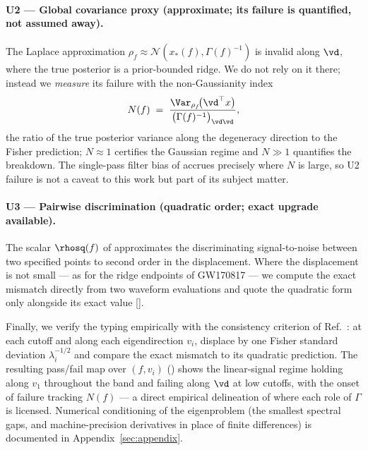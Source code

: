 \paragraph{U2 --- Global covariance proxy (approximate; its failure is
quantified, not assumed away).}
The Laplace approximation
$\rho_f \approx \mathcal{N}(x_{*}(f), \Gamma(f)^{-1})$ is invalid along
$\vd$, where the true posterior is a prior-bounded ridge. We do not
rely on it there; instead we \emph{measure} its failure with the
non-Gaussianity index
\begin{equation}
N(f) \;=\;
\frac{\Var_{\rho_f}\!\bigl(\vd^{\top} x\bigr)}
{\bigl(\Gamma(f)^{-1}\bigr)_{\vd\vd}} ,
\label{eq:ngauss}
\end{equation}
the ratio of the true posterior variance along the degeneracy direction
to the Fisher prediction; $N \approx 1$ certifies the Gaussian regime
and $N \gg 1$ quantifies the breakdown. The single-pass filter bias of
 accrues precisely where $N$ is large, so U2 failure
is not a caveat to this work but part of its subject matter.

\paragraph{U3 --- Pairwise discrimination (quadratic order; exact
upgrade available).}
The scalar $\rhosq(f)$ of  approximates the discriminating
signal-to-noise between two specified points to second order in the
displacement. Where the displacement is not small --- as for the ridge
endpoints of GW170817 --- we compute the exact mismatch directly from
two waveform evaluations and quote the quadratic form only alongside
its exact value [].

Finally, we verify the typing empirically with the consistency
criterion of Ref.~{\cite{vallisneri2008fisher}}: at each cutoff and along
each eigendirection $v_i$, displace by one Fisher standard deviation
$\lambda_i^{-1/2}$ and compare the exact mismatch to its quadratic
prediction. The resulting pass/fail map over $(f, v_i)$
() shows the linear-signal regime holding along $v_1$
throughout the band and failing along $\vd$ at low cutoffs, with the
onset of failure tracking $N(f)$ --- a direct empirical delineation of
where each role of $\Gamma$ is licensed. Numerical conditioning of the
eigenproblem (the smallest spectral gaps, and machine-precision
derivatives in place of finite differences) is documented in
Appendix~{\ref{sec:appendix}}.